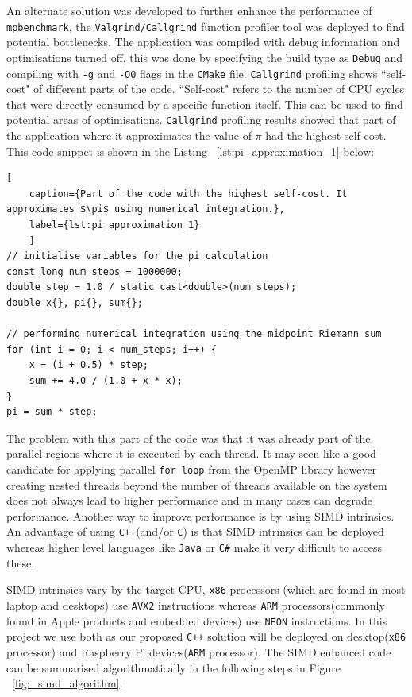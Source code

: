 An alternate solution was developed to further enhance the performance of \texttt{mpbenchmark}, the \texttt{Valgrind/Callgrind} function profiler tool was deployed to find potential bottlenecks. The application was compiled with debug information and optimisations turned off, this was done by specifying the build type as \texttt{Debug} and compiling with \texttt{-g} and \texttt{-O0} flags in the \texttt{CMake} file. \texttt{Callgrind} profiling shows ``self-cost" of different parts of the code. ``Self-cost" refers to the number of CPU cycles that were directly consumed by a specific function itself. This can be used to find potential areas of optimisations\cite{Valgrind2024}. \texttt{Callgrind} profiling results showed that part of the application where it approximates the value of $\pi$ had the highest self-cost. This code snippet is shown in the Listing ~\ref{lst:pi_approximation_1} below:

\begin{lstlisting}[
	caption={Part of the code with the highest self-cost. It approximates $\pi$ using numerical integration.},
	label={lst:pi_approximation_1}
	]
// initialise variables for the pi calculation
const long num_steps = 1000000;
double step = 1.0 / static_cast<double>(num_steps);
double x{}, pi{}, sum{};

// performing numerical integration using the midpoint Riemann sum
for (int i = 0; i < num_steps; i++) {
	x = (i + 0.5) * step;
	sum += 4.0 / (1.0 + x * x);
}
pi = sum * step;
\end{lstlisting}

The problem with this part of the code was that it was already part of the parallel regions where it is executed by each thread. It may seen like a good candidate for applying parallel \texttt{for loop} from the OpenMP library however creating nested threads beyond the number of threads available on the system does not always lead to higher performance and in many cases can degrade performance. Another way to improve performance is by using SIMD intrinsics. An advantage of using \texttt{C++}(and/or \texttt{C}) is that SIMD intrinsics can be deployed whereas higher level languages like \texttt{Java} or \texttt{C\#} make it very difficult to access these. 

SIMD intrinsics vary by the target CPU, \texttt{x86} processors (which are found in most laptop and desktops) use \texttt{AVX2} instructions whereas \texttt{ARM} processors(commonly found in Apple products and embedded devices) use \texttt{NEON} instructions. In this project we use both as our proposed \texttt{C++} solution will be deployed on desktop(\texttt{x86} processor) and Raspberry Pi devices(\texttt{ARM} processor). The SIMD enhanced code can be summarised algorithmatically in the following steps in Figure ~\ref{fig:_simd_algorithm}.

